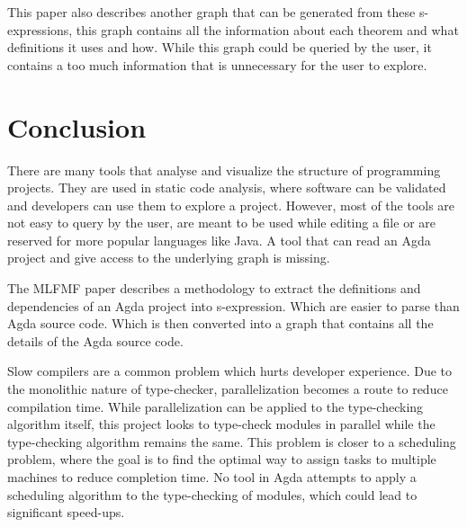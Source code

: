 This paper also describes another graph that can be generated from these
s-expressions, this graph contains all the information about each theorem and
what definitions it uses and how. While this graph could be queried by the
user, it contains a too much information that is unnecessary for the
user to explore.

\section{Conclusion}

There are many tools that analyse and visualize the structure of programming
projects. They are used in static code analysis, where software can be
validated and developers can use them to explore a project. However, most of
the tools are not easy to query by the user, are meant to be used while editing
a file or are reserved for more popular languages like Java. A tool that can
read an Agda project and give access to the underlying graph is missing.

The MLFMF paper \cite{bauer2023mlfmf} describes a methodology to extract the
definitions and dependencies of an Agda project into s-expression. Which are
easier to parse than Agda source code. Which is then converted into a graph
that contains all the details of the Agda source code.

Slow compilers are a common problem which hurts developer experience. Due to
the monolithic nature of type-checker, parallelization becomes a route to
reduce compilation time. While parallelization can be applied to the
type-checking algorithm itself, this project looks to type-check modules in
parallel while the type-checking algorithm remains the same. This problem is
closer to a scheduling problem, where the goal is to find the optimal way to
assign tasks to multiple machines to reduce completion time. No tool in Agda
attempts to apply a scheduling algorithm to the type-checking of modules, which
could lead to significant speed-ups.  




